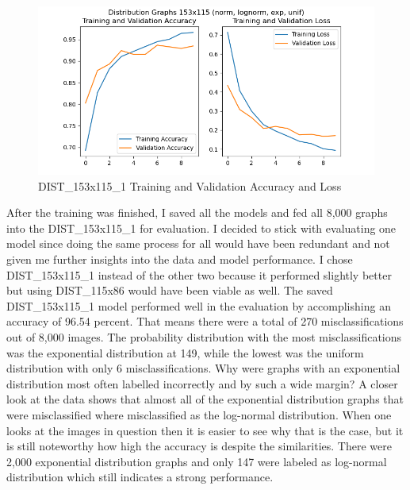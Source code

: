 \documentclass[12pt]{article}
\begin{document}
\begin{figure}
\begin{center}
                    \includegraphics[scale=0.6]{DIST_153x115_1_HIST_RESULTS.png}
                    \caption{DIST\_153x115\_1 Training and Validation Accuracy and Loss}
                    \label{dist-153-115-val-loss}
        
                \end{center}
             
                
            \end{figure}

            After the training was finished, I saved all the models and fed all 8,000 graphs into the DIST\_153x115\_1 for evaluation. 
            I decided to stick with evaluating one model since doing the same process for all would have been redundant 
            and not given me further insights into the data and model performance. 
            I chose DIST\_153x115\_1 instead of the other two because it performed slightly better 
            but using DIST\_115x86 would have been viable as well. The saved DIST\_153x115\_1 model performed well in the evaluation 
            by accomplishing an accuracy of 96.54 percent. That means there were a total of 270 misclassifications out of 8,000 images. 
            The probability distribution with the most misclassifications was the exponential distribution at 149, 
            while the lowest was the uniform distribution with only 6 misclassifications. 
            Why were graphs with an exponential distribution most often labelled incorrectly 
            and by such a wide margin? A closer look at the data shows that almost all of the exponential distribution graphs 
            that were misclassified where misclassified as the log-normal distribution. 
            When one looks at the images in question then it is easier to see why that is the case, 
            but it is still noteworthy how high the accuracy is despite the similarities. 
            There were 2,000 exponential distribution graphs and only 147 were labeled as log-normal distribution 
            which still indicates a strong performance.
            
\end{document}
